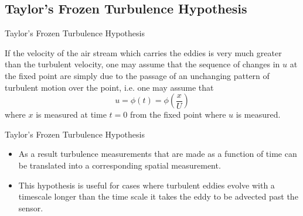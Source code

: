 \subsection{Taylor's Frozen Turbulence Hypothesis} %
\begin{frame}{Taylor's Frozen Turbulence Hypothesis}

\begin{fancyquotes}
		If the velocity of the air stream which carries the eddies is very much greater than the turbulent velocity, one may assume that the sequence of changes in $u$ at the fixed point are simply due to the passage of an unchanging pattern of turbulent motion over the point, i.e. one may assume that
		$$u = \phi(t) = \phi\left(\frac{x}{U}\right)$$
		where $x$ is measured at time $t=0$ from the fixed point where $u$ is measured.
	\end{fancyquotes}
\end{frame}


\begin{frame}{Taylor's Frozen Turbulence Hypothesis}

\begin{itemize}
	\item As a result turbulence measurements that are made as a function of time can be translated into a corresponding spatial measurement.
	\item  This hypothesis is useful for cases where turbulent eddies evolve with a timescale longer than the time scale it takes the eddy to be advected past the sensor.
\end{itemize}
\end{frame}

